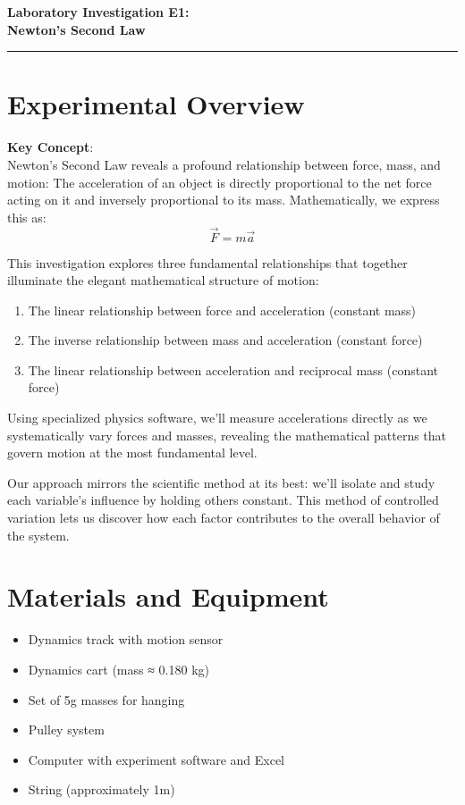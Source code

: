 \documentclass[12pt]{article}
\begin{document}
\begin{center}
{\Large \textbf{Laboratory Investigation E1:}}\\[0.5cm]
{\LARGE \textbf{Newton's Second Law}}\\[1cm]
\rule{\textwidth}{0.4pt}
\end{center}



\section*{Experimental Overview}

 \textbf{Key Concept}:\\
 Newton's Second Law reveals a profound relationship between force, mass, and motion: The acceleration of an object is directly proportional to the net force acting on it and inversely proportional to its mass. Mathematically, we express this as: $$\vec{F} = m\vec{a}$$

This investigation explores three fundamental relationships that together illuminate the elegant mathematical structure of motion:

\begin{enumerate}[label=\arabic*.]
\item The linear relationship between force and acceleration (constant mass)
\item The inverse relationship between mass and acceleration (constant force)
\item The linear relationship between acceleration and reciprocal mass (constant force)
\end{enumerate}

Using specialized physics software, we'll measure accelerations directly as we systematically vary forces and masses, revealing the mathematical patterns that govern motion at the most fundamental level.

\begin{tcolorbox}[colback=conceptgreen!10,colframe=conceptgreen,title=\textbf{Investigation Strategy}]
Our approach mirrors the scientific method at its best: we'll isolate and study each variable's influence by holding others constant. This method of controlled variation lets us discover how each factor contributes to the overall behavior of the system.
\end{tcolorbox}

\section*{Materials and Equipment}
\begin{itemize}
\item Dynamics track with motion sensor
\item Dynamics cart (mass ≈ 0.180 kg)
\item Set of 5g masses for hanging
\item Pulley system
\item Computer with experiment software and Excel
\item String (approximately 1m)
\end{itemize}
\end{document}
